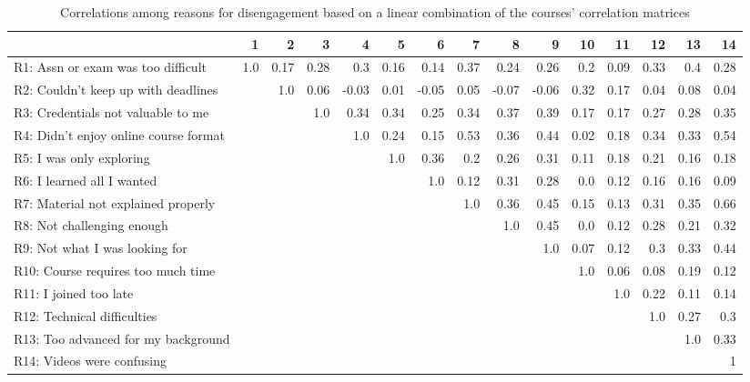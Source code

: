\documentclass{sigchi}\usepackage[]{graphicx}\usepackage[]{color}
\begin{document}
\begin{table}
\label{tab:s1reascor}
\caption{Correlations among reasons for disengagement based on a linear combination of the courses' correlation matrices}
\small
\center
\begin{tabular}{lrrrrrrrrrrrrrr}
\toprule
 & 1 & 2 & 3 & 4 & 5 & 6 & 7 & 8 & 9 & 10 & 11 & 12 & 13 & 14 \\
\midrule
R1: Assn or exam was too difficult & 1.0 & 0.17 & 0.28 & 0.3 & 0.16 & 0.14 & 0.37 & 0.24 & 0.26 & 0.2 & 0.09 & 0.33 & 0.4 & 0.28 \\
R2: Couldn't keep up with deadlines &  & 1.0 & 0.06 & -0.03 & 0.01 & -0.05 & 0.05 & -0.07 & -0.06 & 0.32 & 0.17 & 0.04 & 0.08 & 0.04 \\
R3: Credentials not valuable to me &  &  & 1.0 & 0.34 & 0.34 & 0.25 & 0.34 & 0.37 & 0.39 & 0.17 & 0.17 & 0.27 & 0.28 & 0.35 \\
R4: Didn't enjoy online course format &  &  &  & 1.0 & 0.24 & 0.15 & 0.53 & 0.36 & 0.44 & 0.02 & 0.18 & 0.34 & 0.33 & 0.54 \\
R5: I was only exploring &  &  &  &  & 1.0 & 0.36 & 0.2 & 0.26 & 0.31 & 0.11 & 0.18 & 0.21 & 0.16 & 0.18 \\
R6: I learned all I wanted &  &  &  &  &  & 1.0 & 0.12 & 0.31 & 0.28 & 0.0 & 0.12 & 0.16 & 0.16 & 0.09 \\
R7: Material not explained properly &  &  &  &  &  &  & 1.0 & 0.36 & 0.45 & 0.15 & 0.13 & 0.31 & 0.35 & 0.66 \\
R8: Not challenging enough &  &  &  &  &  &  &  & 1.0 & 0.45 & 0.0 & 0.12 & 0.28 & 0.21 & 0.32 \\
R9: Not what I was looking for &  &  &  &  &  &  &  &  & 1.0 & 0.07 & 0.12 & 0.3 & 0.33 & 0.44 \\
R10: Course requires too much time &  &  &  &  &  &  &  &  &  & 1.0 & 0.06 & 0.08 & 0.19 & 0.12 \\
R11: I joined too late &  &  &  &  &  &  &  &  &  &  & 1.0 & 0.22 & 0.11 & 0.14 \\
R12: Technical difficulties &  &  &  &  &  &  &  &  &  &  &  & 1.0 & 0.27 & 0.3 \\
R13: Too advanced for my background &  &  &  &  &  &  &  &  &  &  &  &  & 1.0 & 0.33 \\
R14: Videos were confusing &  &  &  &  &  &  &  &  &  &  &  &  &  & 1 \\
\bottomrule
\end{tabular}
\end{table}
\end{document}
